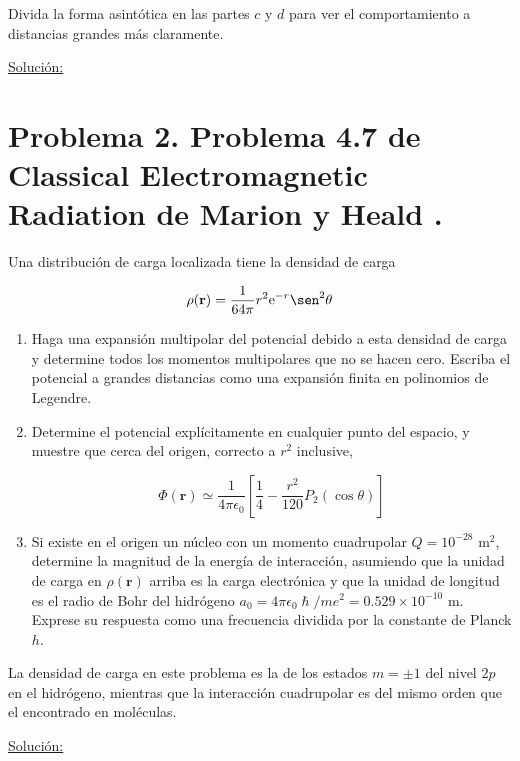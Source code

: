 \documentclass[a4paper,11pt]{article}
\numberwithin{equation}{section}
\newcommand{\euler}{\mathrm{e}}
\begin{document}
Divida la forma asintótica en las partes $c$ y $d$ para ver el comportamiento a 
distancias grandes más claramente.

\vspace{.3cm}

\underline{Solución:} \vspace{.3cm}

\newpage

\section{Problema 2. Problema 4.7 de Classical Electromagnetic Radiation
de Marion y Heald \cite{marion2}.}

Una distribución de carga localizada tiene la densidad de carga 

$$
\rho(\mathbf{r}) = \frac{1}{64\pi}r^2\euler^{-r}\sen^2{\theta}
$$

\begin{enumerate}[label=\textbf{(\alph*)}]
\item Haga una expansión multipolar del potencial debido a esta densidad de 
carga y determine todos los momentos multipolares que no se hacen cero. Escriba 
el potencial a grandes distancias como una expansión finita en polinomios de 
Legendre. 
\item Determine el potencial explícitamente en cualquier punto del espacio, y 
muestre que cerca del origen, correcto a $r^2$ inclusive,

$$
\Phi(\mathbf{r}) \simeq \frac{1}{4\pi\epsilon_0}\left[\frac{1}{4} 
 - \frac{r^2}{120}P_2(\cos{\theta})\right]
$$

\item Si existe en el origen un núcleo con un momento cuadrupolar $Q = 10^{-28}$ m$^2$, 
determine la magnitud de la energía de interacción, asumiendo que la unidad de 
carga en $\rho(\mathbf{r})$ arriba es la carga electrónica y que la unidad de 
longitud es el radio de Bohr del hidrógeno $a_0 = 4\pi\epsilon_0\hslash/me^2 = 
0.529 \times 10^{-10}$ m. Exprese su respuesta como una frecuencia dividida por 
la constante de Planck $h$.
\end{enumerate}

La densidad de carga en este problema es la de los estados $m = \pm 1$ del nivel 
$2p$ en el hidrógeno, mientras que la interacción cuadrupolar es del mismo orden 
que el encontrado en moléculas.

\vspace{.3cm}

\underline{Solución:} \vspace{.3cm}
\end{document}
